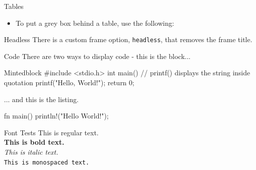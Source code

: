 \begin{frame}[fragile]{Tables}
    \begin{itemize}
        \item To put a grey box behind a table, use the following:
    \end{itemize}
\end{frame}


\begin{frame}[headless,c]{Headless}
There is a custom frame option, \texttt{headless}, that removes the frame title.
\end{frame}


\begin{frame}[fragile]{Code}
    There are two ways to display code - this is the block...
    \begin{mintedblock}[c]{Mintedblock}
#include <stdio.h>
int main() {
	// printf() displays the string inside quotation
	printf("Hello, World!");
	return 0;
}
    \end{mintedblock}
 ... and this is the listing.
    \begin{mintedlisting}[rust]
fn main() {
	println!("Hello World!");
}
    \end{mintedlisting}
\end{frame}

\begin{frame}{Font Tests}
	This is regular text.\\
	\textbf{This is bold text.}\\
	\textit{This is italic text.}\\
	\texttt{This is monospaced text.}
  \end{frame}